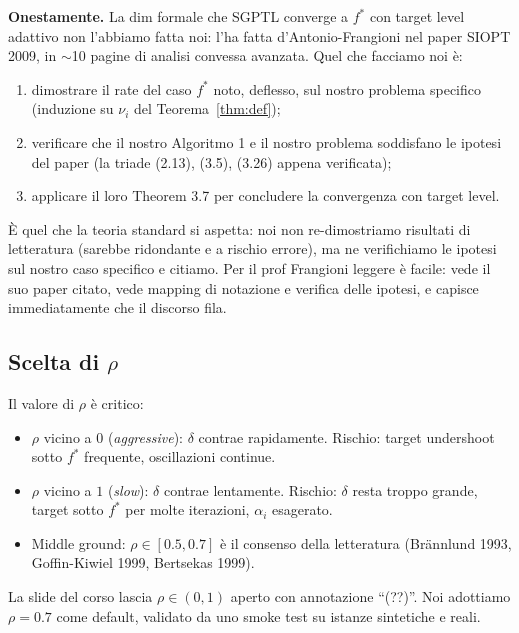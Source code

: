 \documentclass[11pt,a4paper]{article}
\theoremstyle{definition}
\begin{document}
\begin{tcolorbox}[intuition]
\textbf{Onestamente.} La dim formale che SGPTL converge a $f^*$ con target level adattivo non l'abbiamo fatta noi: l'ha fatta d'Antonio-Frangioni nel paper SIOPT 2009, in $\sim$10 pagine di analisi convessa avanzata. Quel che facciamo noi è:
\begin{enumerate}[nosep,leftmargin=*]
\item dimostrare il rate del caso $f^*$ noto, deflesso, sul nostro problema specifico (induzione su $\nu_i$ del Teorema~\ref{thm:def});
\item verificare che il nostro Algoritmo 1 e il nostro problema soddisfano le ipotesi del paper (la triade (2.13), (3.5), (3.26) appena verificata);
\item applicare il loro Theorem 3.7 per concludere la convergenza con target level.
\end{enumerate}
È quel che la teoria standard si aspetta: noi non re-dimostriamo risultati di letteratura (sarebbe ridondante e a rischio errore), ma ne verifichiamo le ipotesi sul nostro caso specifico e citiamo. Per il prof Frangioni leggere è facile: vede il suo paper citato, vede mapping di notazione e verifica delle ipotesi, e capisce immediatamente che il discorso fila.
\end{tcolorbox}

\subsection{Scelta di $\rho$}

Il valore di $\rho$ è critico:
\begin{itemize}[leftmargin=*]
\item $\rho$ vicino a $0$ (\emph{aggressive}): $\delta$ contrae rapidamente. Rischio: target undershoot sotto $f^*$ frequente, oscillazioni continue.
\item $\rho$ vicino a $1$ (\emph{slow}): $\delta$ contrae lentamente. Rischio: $\delta$ resta troppo grande, target sotto $f^*$ per molte iterazioni, $\alpha_i$ esagerato.
\item Middle ground: $\rho\in[0.5, 0.7]$ è il consenso della letteratura (Brännlund 1993, Goffin-Kiwiel 1999, Bertsekas 1999).
\end{itemize}
La slide del corso lascia $\rho\in(0,1)$ aperto con annotazione ``(??)''. Noi adottiamo $\rho=0.7$ come default, validato da uno smoke test su istanze sintetiche e reali.

\end{document}

